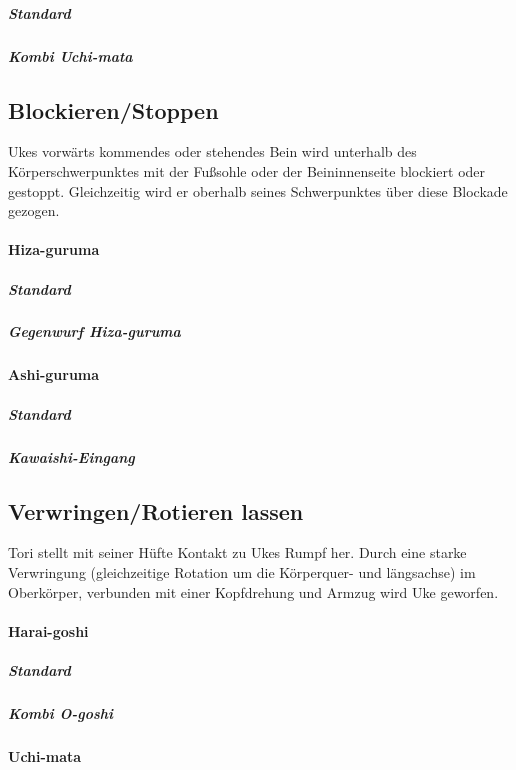 \documentclass[justified, a4paper, notitlepage, captions=tableheading, nobib]{tufte-handout}
\begin{document}
\subparagraph{Standard}
\label{sec:orgf5d9875}

\subparagraph{Kombi Uchi-mata}
\label{sec:org81ef120}

\subsection{Blockieren/Stoppen }
\label{sec:org60f4c6c}

Ukes vorwärts kommendes oder stehendes Bein wird unterhalb des Körperschwerpunktes mit der
Fußsohle oder der Beininnenseite blockiert oder gestoppt. Gleichzeitig wird er oberhalb seines
Schwerpunktes über diese Blockade gezogen.

\paragraph{Hiza-guruma }
\label{sec:org053466b}

\subparagraph{Standard}
\label{sec:org5db08a5}

\subparagraph{Gegenwurf Hiza-guruma}
\label{sec:org1fa7837}

\paragraph{Ashi-guruma }
\label{sec:org730c5c6}

\subparagraph{Standard}
\label{sec:orgbfe2aa3}

\subparagraph{Kawaishi-Eingang}
\label{sec:org7e3cf92}

\subsection{Verwringen/Rotieren lassen }
\label{sec:org9b6af2c}

Tori stellt mit seiner Hüfte Kontakt zu Ukes Rumpf her. Durch eine starke Verwringung (gleichzeitige
Rotation um die Körperquer- und längsachse) im Oberkörper, verbunden mit einer Kopfdrehung und
Armzug wird Uke geworfen.

\paragraph{Harai-goshi }
\label{sec:org5785dc3}

\subparagraph{Standard}
\label{sec:orga0794c7}

\subparagraph{Kombi O-goshi}
\label{sec:org64304c4}


\paragraph{Uchi-mata }
\label{sec:org54e602d}
\end{document}
